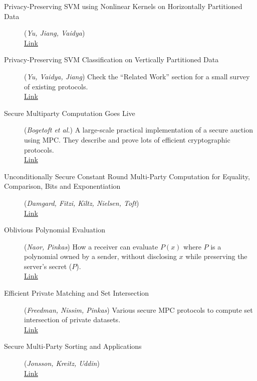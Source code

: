 \documentclass[11pt]{article}
\begin{document}
\begin{description}
	\item [Privacy-Preserving SVM using Nonlinear Kernels on Horizontally Partitioned Data] (\emph{Yu, Jiang, Vaidya})
	\\ \href{http://cimic.rutgers.edu/~jsvaidya/pub-papers/vaidyaSVM-sac06.pdf}{Link}
	      
	\item [Privacy-Preserving SVM Classification on Vertically Partitioned Data] (\emph{Yu, Vaidya, Jiang})
	Check the ``Related Work'' section for a small survey of existing protocols.
	\\ \href{http://link.springer.com/content/pdf/10.1007%2F11731139_74.pdf}{Link}
	
	                                   
	\item [Secure Multiparty Computation Goes Live](\emph{Bogetoft et al.}) A large-scale practical implementation of a secure auction using MPC. They describe and prove lots of efficient cryptographic protocols.  
	\\ \href{http://eprint.iacr.org/2008/068.pdf}{Link}
       
	\item [Unconditionally Secure Constant Round Multi-Party Computation for Equality, Comparison, Bits and Exponentiation](\emph{Damgard, Fitzi, Kiltz, Nielsen, Toft})
	\\ \href{http://www.iacr.org/cryptodb/archive/2006/TCC/3624/3624.pdf}{Link}
             
	\item [Oblivious Polynomial Evaluation](\emph{Naor, Pinkas}) How a receiver can evaluate $P(x)$ where $P$ is a polynomial owned by a sender, without disclosing $x$ while preserving the server's secret ($P$).
	\\ \href{http://citeseerx.ist.psu.edu/viewdoc/download?doi=10.1.1.73.7197&rep=rep1&type=pdf}{Link}
                                                                          
	\item [Efficient Private Matching and Set Intersection](\emph{Freedman, Nissim, Pinkas}) Various secure MPC protocols to compute set intersection of private datasets.
	\\ \href{http://www.cs.princeton.edu/~mfreed/docs/FNP04-pm.pdf}{Link}
	
	\item [Secure Multi-Party Sorting and Applications](\emph{Jonsson, Kreitz, Uddin})
	\\ \href{http://eprint.iacr.org/2011/122.pdf}{Link}
	                  

\end{description}
\end{document}
